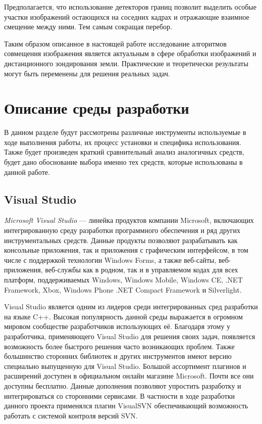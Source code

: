 Предполагается, что использование детекторов границ позволит выделить особые участки изображений остающихся на соседних кадрах и отражающие взаимное смещение между ними. Тем самым сокращая перебор.

Таким образом описанное в настоящей работе исследование алгоритмов совмещения изображения является актуальным в сфере обработки изображений и дистанционного зондирования земли. Практические и теоретически результаты могут быть переменены для решения реальных задач.  

\section{Описание среды разработки}
\label{sec:env_description}
В данном разделе будут рассмотрены различные инструменты используемые в ходе выполнения работы, их процесс установки и специфика использования. Также будет произведен краткий сравнительный анализ аналогичных средств, будет дано обоснование выбора именно тех средств, которые использованы в данной работе. 
\subsection{Visual Studio}
\label{sub:env_description:vs}
\textit{Microsoft Visual Studio} --- линейка продуктов компании Microsoft, включающих интегрированную среду разработки программного обеспечения и ряд других инструментальных средств. Данные продукты позволяют разрабатывать как консольные приложения, так и приложения с графическим интерфейсом, в том числе с поддержкой технологии Windows Forms, а также веб-сайты, веб-приложения, веб-службы как в родном, так и в управляемом кодах для всех платформ, поддерживаемых Windows, Windows Mobile, Windows CE, .NET Framework, Xbox, Windows Phone .NET Compact Framework и Silverlight.

Visual Studio является одним из лидеров среди интегрированных сред разработки на языке C++. Высокая популярность данной среды выражается в огромном мировом сообществе разработчиков использующих её. Благодаря этому у разработчика, применяющего Visual Studio для решения своих задач, появляется возможность более быстрого решения часто возникающих проблем. Также большинство сторонних библиотек и других инструментов имеют версию специально выпущенную для Visual Studio. Большой ассортимент плагинов и расширений доступен в официальном онлайн магазине Microsoft. Почти все они доступны бесплатно. Данные дополнения позволяют упростить разработку и интегрироваться со сторонними сервисами. В частности в ходе разработки данного проекта применялся плагин VisualSVN обеспечивающий возможность работать с системой контроля версий SVN.

